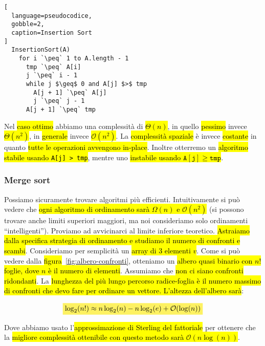 \documentclass[a4paper,11pt,oneside]{article}
\theoremstyle{plain}
\theoremstyle{definition}
\theoremstyle{remark}
\newcommand{\mhl}[1]{\colorbox{hlcolor}{$\displaystyle #1$}}
\newcommand{\peq}{$\gets$}
\begin{document}
\begin{lstlisting}[
  language=pseudocodice,
  gobble=2,
  caption=Insertion Sort
]
  InsertionSort(A)
    for i `\peq` 1 to A.length - 1
      tmp `\peq` A[i]
      j `\peq` i - 1
      while j $\geq$ 0 and A[j] $>$ tmp
        A[j + 1] `\peq` A[j]
        j `\peq` j - 1
      A[j + 1] `\peq` tmp
\end{lstlisting}

Nel \hl{caso ottimo} abbiamo una complessità di \hl{$\Theta(n)$}, in quello
\hl{pessimo} invece \hl{$\Theta(n^2)$}, in \hl{generale} invece
\hl{$\mathcal{O}(n^2)$}. La \hl{complessità spaziale} è invece \hl{costante} in
quanto \hl{tutte le operazioni avvengono in-place}. Inoltre otterremo un
\hl{algoritmo stabile usando \texttt{A[j] > tmp}}, mentre uno \hl{instabile
usando $\mathtt{A[j]} \geq \mathtt{tmp}$}.

\subsubsection{Merge sort}\label{sec:merge-sort}

Possiamo sicuramente trovare algoritmi più efficienti. Intuitivamente si può
vedere che \hl{ogni algoritmo di ordinamento sarà $\Omega(n)$ e
$\mathcal{O}(n^2)$} (si possono trovare anche limiti superiori maggiori, ma noi
consideriamo solo ordinamenti ``intelligenti''). Proviamo ad avvicinarci al
limite inferiore teoretico. \hl{Astraiamo dalla specifica strategia di
ordinamento e studiamo il numero di confronti e scambi}. Consideriamo per
semplicità un \hl{array di $3$ elementi $v$}. Come si può vedere dalla
\hl{figura}~\ref{fig:albero-confronti}, otteniamo un \hl{albero quasi binario
con $n!$ foglie, dove $n$ è il numero di elementi}. Assumiamo che \hl{non ci
siano confronti ridondanti}. La \hl{lunghezza del più lungo percorso
radice-foglia è il numero massimo di confronti che devo fare per ordinare un
vettore. L'altezza dell'albero sarà}:

\begin{equation}
  \mhl{
    \log_2(n!) \approx n\log_2(n) - n\log_2(e) + \mathcal{O}(\log(n))
  }
\end{equation}

Dove abbiamo usato l'\hl{approssimazione di Sterling del fattoriale} per
ottenere che la \hl{migliore complessità ottenibile con questo metodo sarà
$\mathcal{O}(n\log(n))$}.
\end{document}
